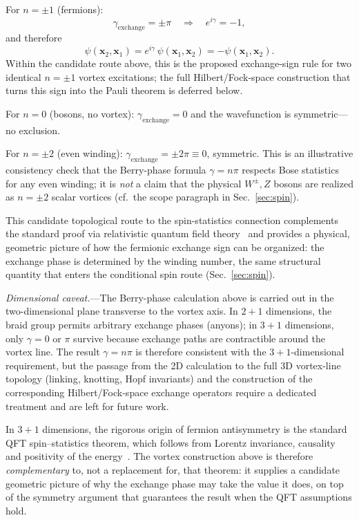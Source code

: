 \documentclass[aps,prd,onecolumn,superscriptaddress,nofootinbib,showpacs,12pt,notitlepage]{revtex4-2}
\begin{document}
For $n = \pm 1$ (fermions):
\begin{equation}\label{eq:exchange_fermion}
  \gamma_{\mathrm{exchange}} = \pm\pi
  \quad\Rightarrow\quad
  e^{i\gamma} = -1,
\end{equation}
and therefore
\begin{equation}\label{eq:antisymmetry}
  \boxed{
  \psi(\mathbf{x}_2, \mathbf{x}_1)
  = e^{i\gamma}\,\psi(\mathbf{x}_1, \mathbf{x}_2)
  = -\psi(\mathbf{x}_1, \mathbf{x}_2).
  }
\end{equation}
Within the candidate route above, this is the proposed
exchange-sign rule for two identical $n=\pm1$ vortex
excitations; the full Hilbert/Fock-space construction that
turns this sign into the Pauli theorem is deferred below.

For $n = 0$ (bosons, no vortex):
$\gamma_{\mathrm{exchange}} = 0$ and the wavefunction is
symmetric---no exclusion.

For $n = \pm 2$ (even winding):
$\gamma_{\mathrm{exchange}} = \pm 2\pi \equiv 0$,
symmetric.  This is an illustrative consistency check
that the Berry-phase formula $\gamma = n\pi$ respects
Bose statistics for any even winding; it is \emph{not}
a claim that the physical $W^{\pm}, Z$ bosons are
realized as $n = \pm 2$ scalar vortices (cf.\ the scope
paragraph in Sec.~\ref{sec:spin}).

This candidate topological route to the spin-statistics
connection complements the standard proof via relativistic
quantum field theory~\cite{Pauli1940,Streater1964} and
provides a physical, geometric picture of how the fermionic
exchange sign can be organized: the exchange phase is
determined by the winding number, the same structural
quantity that enters the conditional spin route
(Sec.~\ref{sec:spin}).

\textit{Dimensional caveat.}---The Berry-phase calculation
above is carried out in the two-dimensional plane
transverse to the vortex axis.  In $2{+}1$ dimensions,
the braid group permits arbitrary exchange phases
(anyons); in $3{+}1$ dimensions, only $\gamma = 0$ or
$\pi$ survive because exchange paths are contractible
around the vortex line.  The result $\gamma = n\pi$ is
therefore consistent with the $3{+}1$-dimensional
requirement, but the passage from the 2D calculation to
the full 3D vortex-line topology (linking, knotting,
Hopf invariants) and the construction of the corresponding
Hilbert/Fock-space exchange operators require a dedicated
treatment and are left for future work.

In $3{+}1$ dimensions, the rigorous origin of fermion
antisymmetry is the standard QFT spin--statistics
theorem, which follows from Lorentz invariance,
causality and positivity of the
energy~\cite{Pauli1940,Streater1964}.  The vortex
construction above is therefore \emph{complementary}
to, not a replacement for, that theorem: it supplies a
candidate geometric picture of why the exchange phase may
take the value it does, on top of the symmetry argument that
guarantees the result when the QFT assumptions hold.
\end{document}

